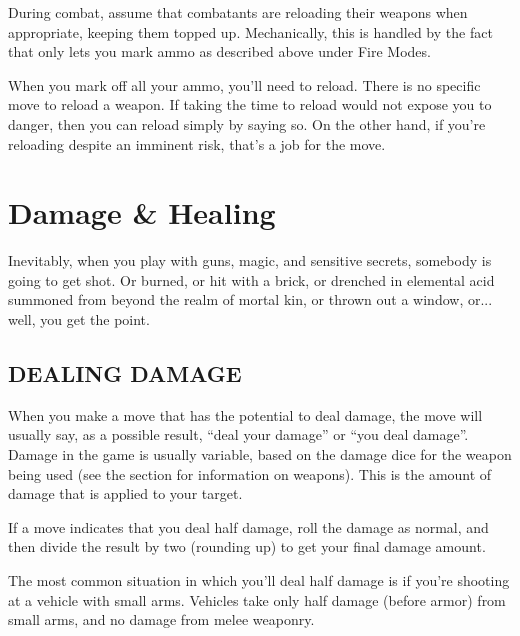 During combat, assume that combatants are reloading their weapons when appropriate, keeping them topped up. Mechanically, this is handled by the fact that  only lets you mark ammo as described above under Fire Modes.

When you mark off all your ammo, you’ll need to reload. There is no specific move to reload a weapon. If taking the time to reload would not expose you to danger, then you can reload simply by saying so. On the other hand, if you’re reloading despite an imminent risk, that’s a job for the  move.



\section{Damage \& Healing}

Inevitably, when you play with guns, magic, and sensitive secrets, somebody is going to get shot. Or burned, or hit with a brick, or drenched in elemental acid summoned from beyond the realm of mortal kin, or thrown out a window, or... well, you get the point.


\subsection*{DEALING DAMAGE}
When you make a move that has the potential to deal damage, the move will usually say, as a possible result, ``deal your damage'' or ``you deal damage''. Damage in the game is usually variable, based on the damage dice for the weapon being used (see the  section for information on weapons). This is the amount of damage that is applied to your target.


If a move indicates that you deal half damage, roll the damage as normal, and then divide the result by two (rounding up) to get your final damage amount.

The most common situation in which you’ll deal half damage is if you’re shooting at a vehicle with small arms. Vehicles take only half damage (before armor) from small arms, and no damage from melee weaponry.



